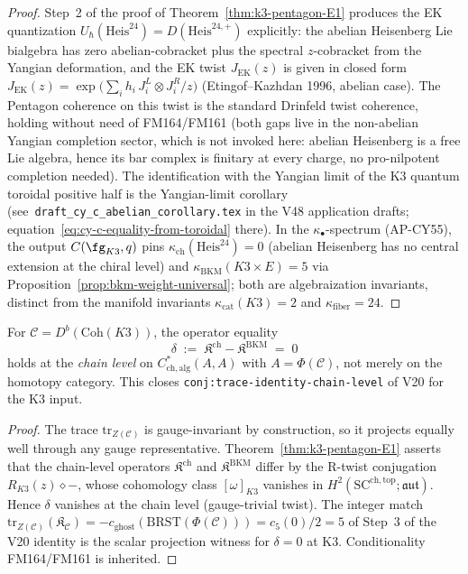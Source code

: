 \begin{proof}
Step~2 of the proof of Theorem~\ref{thm:k3-pentagon-E1} produces the
EK quantization $U_\hbar(\mathrm{Heis}^{24}) =
D(\mathrm{Heis}^{24,+})$ explicitly: the abelian Heisenberg Lie
bialgebra has zero abelian-cobracket plus the spectral
$z$-cobracket from the Yangian deformation, and the EK twist
$J_{\mathrm{EK}}(z)$ is given in closed form
$J_{\mathrm{EK}}(z) = \exp\bigl(\sum_{i} h_i\, J_i^L \otimes J_i^R / z\bigr)$
\textup{(}Etingof--Kazhdan 1996, abelian case\textup{).}  The Pentagon
coherence on this twist is the standard Drinfeld twist coherence,
holding without need of FM164/FM161 \textup{(}both gaps live in the
non-abelian Yangian completion sector, which is not invoked here:
abelian Heisenberg is a free Lie algebra, hence its bar complex is
finitary at every charge, no pro-nilpotent completion needed\textup{).}
The identification with the Yangian limit of the K$3$ quantum toroidal
positive half is the Yangian-limit corollary
\textup{(}see~\texttt{draft\_cy\_c\_abelian\_corollary.tex} in the V48
application drafts; equation~\eqref{eq:cy-c-equality-from-toroidal}
there\textup{).}  In the $\kappa_\bullet$-spectrum (AP-CY55), the
output $C(\fg_{K3}, q)$ pins
$\kappa_{\mathrm{ch}}(\mathrm{Heis}^{24}) = 0$ \textup{(}abelian
Heisenberg has no central extension at the chiral level\textup{)} and
$\kappa_{\mathrm{BKM}}(K3 \times E) = 5$ via
Proposition~\ref{prop:bkm-weight-universal}; both are algebraization
invariants, distinct from the manifold invariants
$\kappa_{\mathrm{cat}}(K3) = 2$ and $\kappa_{\mathrm{fiber}} = 24$.
\end{proof}

\begin{corollary}
\label{cor:k3-v20-step-3-chain-level}
\ClaimStatusProvedHere
For $\mathcal{C} = D^b(\mathrm{Coh}(K3))$, the operator equality
\[
  \delta \;:=\; \mathfrak{K}^{\mathrm{ch}} - \mathfrak{K}^{\mathrm{BKM}}
   \;=\; 0
\]
holds at the \emph{chain level} on $C^*_{\mathrm{ch,alg}}(A, A)$ with
$A = \Phi(\mathcal{C})$, not merely on the homotopy category.  This
closes \texttt{conj:trace-identity-chain-level} of V20 for the K$3$
input.
\end{corollary}

\begin{proof}
The trace $\mathrm{tr}_{Z(\mathcal{C})}$ is gauge-invariant by
construction, so it projects equally well through any gauge
representative.  Theorem~\ref{thm:k3-pentagon-E1} asserts that the
chain-level operators $\mathfrak{K}^{\mathrm{ch}}$ and
$\mathfrak{K}^{\mathrm{BKM}}$ differ by the R-twist conjugation
$R_{K3}(z) \diamond -$, whose cohomology class
$[\omega]_{K3}$ vanishes in
$H^2(\mathrm{SC}^{\mathrm{ch,top}}; \mathfrak{aut})$.  Hence
$\delta$ vanishes at the chain level \textup{(}gauge-trivial
twist\textup{).}  The integer match
$\mathrm{tr}_{Z(\mathcal{C})}(\mathfrak{K}_{\mathcal{C}}) =
 -c_{\mathrm{ghost}}(\mathrm{BRST}(\Phi(\mathcal{C}))) =
 c_5(0)/2 = 5$
of Step~3 of the V20 identity is the scalar projection witness for
$\delta = 0$ at K$3$.  Conditionality FM164/FM161 is inherited.
\end{proof}

